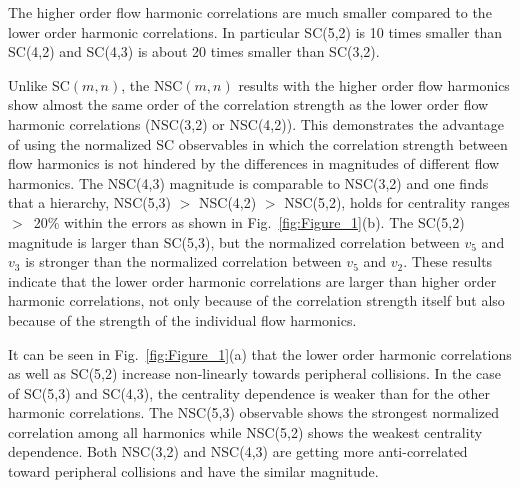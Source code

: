 The higher order flow harmonic correlations are much smaller compared to the lower order harmonic correlations.
In particular SC(5,2) is 10 times smaller than SC(4,2) and SC(4,3) is about 20 times smaller than SC(3,2).

Unlike SC$(m,n)$, the NSC$(m,n)$ results with the higher order flow harmonics show almost the same order of the correlation strength as the lower order flow harmonic correlations (NSC(3,2) or NSC(4,2)).
This demonstrates the advantage of using the normalized SC observables in which the correlation strength between flow harmonics is not hindered by the differences in magnitudes of different flow harmonics. The NSC(4,3) magnitude is comparable to NSC(3,2) and one finds that a hierarchy, NSC(5,3) $>$ NSC(4,2) $>$ NSC(5,2), holds for centrality ranges $>$~20\% within the errors as shown in Fig.~\ref{fig:Figure_1}(b).
The SC(5,2) magnitude is larger than SC(5,3), but the normalized correlation between $v_5$ and $v_3$ is stronger than the normalized correlation between $v_5$ and $v_2$. 
These results indicate that the lower order harmonic correlations are larger than higher order harmonic correlations, not only because of the correlation strength itself but also because of the strength of the individual flow harmonics.

It can be seen in Fig.~\ref{fig:Figure_1}(a) that the lower order harmonic correlations as well as SC(5,2) increase non-linearly towards peripheral collisions.
In the case of SC(5,3) and SC(4,3), the centrality dependence is weaker than for the other harmonic correlations.
The NSC(5,3) observable shows the strongest normalized correlation among all harmonics while NSC(5,2) shows the weakest centrality dependence.
Both NSC(3,2) and NSC(4,3) are getting more anti-correlated toward peripheral collisions and have the similar magnitude.

